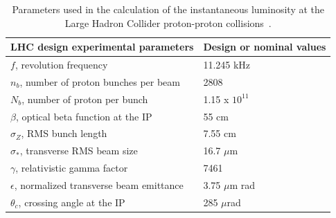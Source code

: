 \begin{table}[htb]
\centering
\caption[Parameters used in the calculation of the instantaneous luminosity at the Large Hadron Collider proton-proton collisions]{\label{tab:lumiparameters} Parameters used in the calculation of the instantaneous luminosity at the Large Hadron Collider proton-proton collisions~\cite{Bruning:782076}.}
\begin{tabularx}{\textwidth}{XX}
\hline
LHC design experimental parameters                      & Design or nominal values     \\
\hline
$f$, revolution frequency                               & 11.245 kHz        \\[0pt]
$n_{b}$, number of proton bunches per beam              & 2808              \\[0pt]
$N_{b}$, number of proton per bunch                     & 1.15 x $10^{11}$  \\[0pt]
$\beta$, optical beta function at the IP                & 55 cm             \\[0pt]
$\sigma_{Z}$,  RMS bunch length                         & 7.55 cm           \\[0pt]
$\sigma_{*}$,  transverse RMS beam size                 & 16.7 $\mu$m       \\[0pt]
$\gamma$, relativistic gamma factor                     & 7461              \\[0pt]
$\epsilon$, normalized transverse beam emittance        & 3.75 $\mu$m rad   \\[0pt]
$\theta_{c}$, crossing angle at the IP                  & 285  $\mu$rad     \\[0pt]
\hline
\end{tabularx}
\end{table}

